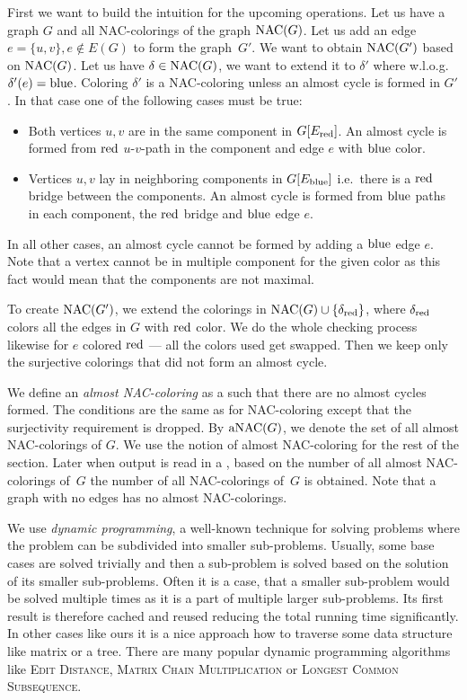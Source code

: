 First we want to build the intuition for the upcoming operations.
Let us have a graph \( G \) and all NAC-colorings of the graph \( \operatorname{NAC}(G) \).
Let us add an edge \( e = \{u, v\}, e \not\in E(G) \) to form the graph~\( G' \).
We want to obtain \( \operatorname{NAC}(G') \) based on \( \operatorname{NAC}(G) \).
%
Let us have \( \delta \in \operatorname{NAC}(G) \),
we want to extend it to \( \delta' \) where w.l.o.g.\ \( \delta'(e) = \text{blue} \).
Coloring \( \delta' \) is a NAC-coloring unless an almost cycle is formed in \( G' \).
In that case one of the following cases must be true:
%
\begin{itemize}
	\item Both vertices \( u, v \) are in the same component in \( G[E_\text{red}] \).
	      An almost cycle is formed
	      from \( \text{red} \) \( u \)-\( v \)-path in the component
	      and edge \( e \) with \( \text{blue} \) color.
	\item Vertices \( u, v \) lay in neighboring components in \( G[E_\text{blue}] \)
	      i.e.\ there is a \( \text{red} \) bridge between the components.
	      An almost cycle is formed from \( \text{blue} \) paths in each component,
	      the \( \text{red} \) bridge and \( \text{blue} \) edge \( e \).
\end{itemize}
%
In all other cases, an almost cycle cannot be formed by adding a \( \text{blue} \) edge \( e \).
Note that a vertex cannot be in multiple component for the given color
as this fact would mean that the components are not maximal.

To create \( \operatorname{NAC}(G') \), we extend the colorings
in \( \operatorname{NAC}(G) \cup \{ \delta_{\text{red}} \} \), where \( \delta_{\text{red}} \)
colors all the edges in \( G \) with \( \text{red} \) color.
We do the whole checking process likewise
for \( e \) colored \( \text{red} \) --- all the colors used get swapped.
Then we keep only the surjective colorings that did not form an almost cycle.

We define an \emph{almost NAC-coloring}
as a \rbcol{} such that there are no almost cycles formed.
The conditions are the same as for NAC-coloring
except that the surjectivity requirement is dropped.
By \( \operatorname{aNAC}(G) \), we denote the set of all almost NAC-colorings of \( G \).
We use the notion of almost NAC-coloring for the rest of the section.
Later when output is read in a \RootNode{},
based on the number of all almost NAC-colorings of~\( G \)
the number of all NAC-colorings of~\( G \) is obtained.
Note that a graph with no edges has no almost NAC-colorings.

We use \emph{dynamic programming}, a well-known technique for solving problems
where the problem can be subdivided into smaller sub-problems.
Usually, some base cases are solved trivially and then a sub-problem
is solved based on the solution of its smaller sub-problems.
%
Often it is a case, that a smaller sub-problem would be solved multiple times
as it is a part of multiple larger sub-problems.
Its first result is therefore cached and reused
reducing the total running time significantly.
%
In other cases like ours it is a nice approach how to traverse
some data structure like matrix or a tree.
%
There are many popular dynamic programming algorithms
like \textsc{Edit Distance}, \textsc{Matrix Chain Multiplication} or \textsc{Longest Common Subsequence}.

